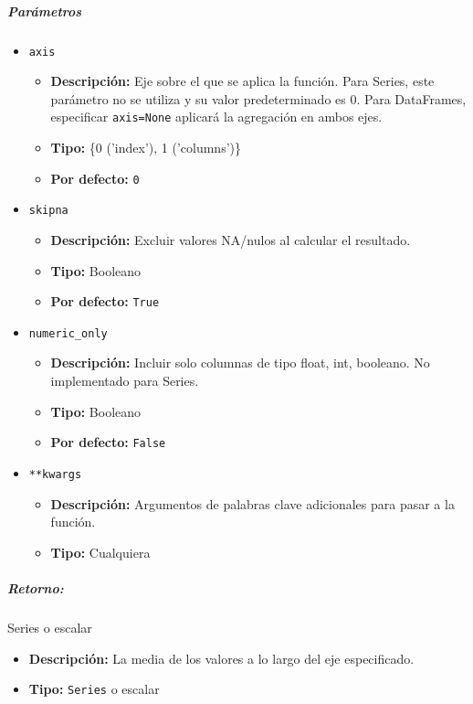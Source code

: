 \subparagraph{\textbf{Parámetros}}
\begin{itemize}
    \item \texttt{axis}
          \begin{itemize}
              \item \textbf{Descripción:} Eje sobre el que se aplica la
                    función. Para Series, este parámetro no se utiliza y su valor predeterminado es
                    0. Para DataFrames, especificar \texttt{axis=None} aplicará la agregación en
                    ambos ejes.
              \item \textbf{Tipo:} \{0 ('index'), 1 ('columns')\}
              \item \textbf{Por defecto:} \texttt{0}
          \end{itemize}

    \item \texttt{skipna}
          \begin{itemize}
              \item \textbf{Descripción:} Excluir valores NA/nulos al calcular
                    el resultado.
              \item \textbf{Tipo:} Booleano
              \item \textbf{Por defecto:} \texttt{True}
          \end{itemize}

    \item \texttt{numeric\_only}
          \begin{itemize}
              \item \textbf{Descripción:} Incluir solo columnas de tipo float,
                    int, booleano. No implementado para Series.
              \item \textbf{Tipo:} Booleano
              \item \textbf{Por defecto:} \texttt{False}
          \end{itemize}

    \item \texttt{**kwargs}
          \begin{itemize}
              \item \textbf{Descripción:} Argumentos de palabras clave
                    adicionales para pasar a la función.
              \item \textbf{Tipo:} Cualquiera
          \end{itemize}
\end{itemize}

\subparagraph{Retorno:} Series o escalar
\begin{itemize}
    \item \textbf{Descripción:} La media de los valores a lo largo del eje
          especificado.
    \item \textbf{Tipo:} \texttt{Series} o escalar
\end{itemize}

